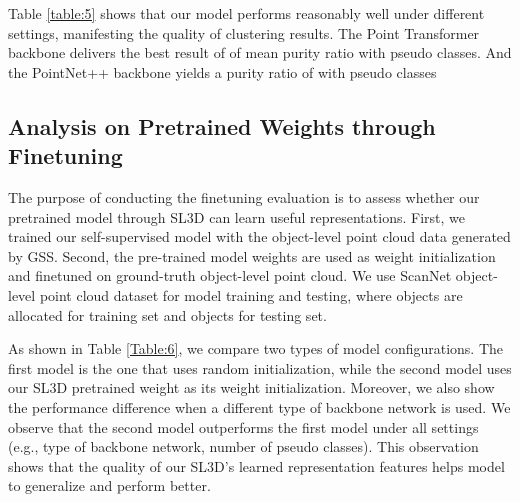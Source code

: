 \documentclass{article}
\begin{document}
Table \ref{table:5} shows that our model performs reasonably well  under different settings, manifesting the quality of clustering results. The Point Transformer backbone delivers the best result of  of mean purity ratio  with  pseudo classes. And the PointNet++ backbone yields a purity ratio of   with  pseudo classes 

\subsection{Analysis on Pretrained Weights through Finetuning}
The purpose of conducting the  finetuning evaluation is to assess whether our pretrained model through SL3D can learn useful representations. 
First, we trained our self-supervised model with the object-level point cloud data generated by GSS. 
Second, the pre-trained model weights are used as weight initialization and finetuned on ground-truth object-level point cloud. We use ScanNet object-level point cloud dataset for model training and testing, where  objects are allocated for training set and  objects for testing set.

As shown in Table \ref{Table:6}, we compare two types of model configurations. The first model is the one that uses random initialization, while the second model uses our SL3D pretrained weight as its weight initialization. Moreover, we also show the performance difference when a different type of backbone network is used. We observe that the second model outperforms the first model under all settings (e.g., type of backbone network, number of pseudo classes). This observation shows that the quality of our SL3D’s learned representation features helps model to generalize and perform better.
\end{document}
